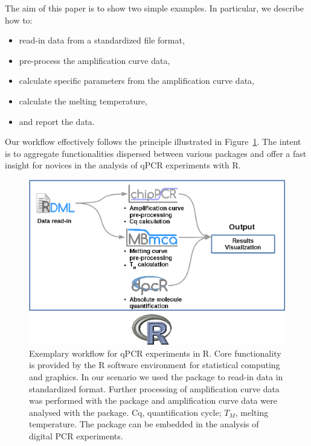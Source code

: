 The aim of this paper is to show two simple examples. In 
particular, we describe how to:
\begin{itemize}
 \item read-in data from a standardized file format,
 \item pre-process the amplification curve data,
 \item calculate specific parameters from the amplification curve data,
 \item calculate the melting temperature,
 \item and report the data.
\end{itemize}

Our workflow effectively follows the principle illustrated in 
Figure~\ref{figure:workflow}. The intent is to aggregate functionalities 
dispersed between various packages and offer a fast insight for novices 
in the analysis of qPCR experiments with R.

\begin{figure}[htbp]
  \centering
  \includegraphics{figures/workflow.png}
  \caption{Exemplary workflow for qPCR experiments in R. Core functionality is 
provided by the R software environment for statistical computing and graphics. 
In our scenario we used the  package to read-in data in 
standardized format. Further processing of amplification curve data was 
performed with the  package and amplification curve data were 
analysed with the  package. Cq, quantification cycle; $T_{M}$, 
melting temperature. The  package can be embedded in the analysis 
of digital PCR experiments.
} \label{figure:workflow}
\end{figure}

